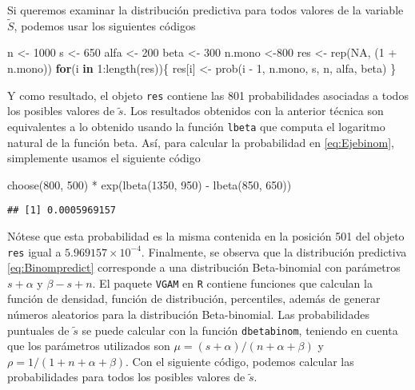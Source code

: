 \documentclass[
  12pt,
  spanish,
]{book}
\newenvironment{Shaded}{\begin{snugshade}}{\end{snugshade}}
\newcommand{\ConstantTok}[1]{\textcolor[rgb]{0.00,0.00,0.00}{#1}}
\newcommand{\ControlFlowTok}[1]{\textcolor[rgb]{0.13,0.29,0.53}{\textbf{#1}}}
\newcommand{\DecValTok}[1]{\textcolor[rgb]{0.00,0.00,0.81}{#1}}
\newcommand{\FunctionTok}[1]{\textcolor[rgb]{0.00,0.00,0.00}{#1}}
\newcommand{\NormalTok}[1]{#1}
\newcommand{\OtherTok}[1]{\textcolor[rgb]{0.56,0.35,0.01}{#1}}
\newcommand{\SpecialCharTok}[1]{\textcolor[rgb]{0.00,0.00,0.00}{#1}}
\theoremstyle{definition}
\theoremstyle{definition}
\theoremstyle{definition}
\theoremstyle{definition}
\theoremstyle{remark}
\begin{document}
Si queremos examinar la distribución predictiva para todos valores de la
variable \(\tilde{S}\), podemos usar los siguientes códigos

\begin{Shaded}
\begin{Highlighting}[]
\NormalTok{n }\OtherTok{\textless{}{-}} \DecValTok{1000}
\NormalTok{s }\OtherTok{\textless{}{-}} \DecValTok{650} 
\NormalTok{alfa }\OtherTok{\textless{}{-}} \DecValTok{200}
\NormalTok{beta }\OtherTok{\textless{}{-}} \DecValTok{300} 
\NormalTok{n.mono }\OtherTok{\textless{}{-}}\DecValTok{800}
\NormalTok{res }\OtherTok{\textless{}{-}} \FunctionTok{rep}\NormalTok{(}\ConstantTok{NA}\NormalTok{, (}\DecValTok{1} \SpecialCharTok{+}\NormalTok{ n.mono)) }
\ControlFlowTok{for}\NormalTok{(i }\ControlFlowTok{in} \DecValTok{1}\SpecialCharTok{:}\FunctionTok{length}\NormalTok{(res))\{}
\NormalTok{  res[i] }\OtherTok{\textless{}{-}} \FunctionTok{prob}\NormalTok{(i }\SpecialCharTok{{-}} \DecValTok{1}\NormalTok{, n.mono, s, n, alfa, beta)}
\NormalTok{\}}
\end{Highlighting}
\end{Shaded}

Y como resultado, el objeto \texttt{res} contiene las 801 probabilidades asociadas a todos los posibles valores de \(\tilde{s}\). Los resultados obtenidos con la anterior técnica son equivalentes a lo
obtenido usando la función \texttt{lbeta} que computa el logaritmo natural
de la función beta. Así, para calcular la probabilidad en
\eqref{eq:Ejebinom}, simplemente usamos el siguiente código

\begin{Shaded}
\begin{Highlighting}[]
\FunctionTok{choose}\NormalTok{(}\DecValTok{800}\NormalTok{, }\DecValTok{500}\NormalTok{) }\SpecialCharTok{*} \FunctionTok{exp}\NormalTok{(}\FunctionTok{lbeta}\NormalTok{(}\DecValTok{1350}\NormalTok{, }\DecValTok{950}\NormalTok{) }\SpecialCharTok{{-}} \FunctionTok{lbeta}\NormalTok{(}\DecValTok{850}\NormalTok{, }\DecValTok{650}\NormalTok{)) }
\end{Highlighting}
\end{Shaded}

\begin{verbatim}
## [1] 0.0005969157
\end{verbatim}

Nótese que esta probabilidad es la misma contenida en la posición 501 del objeto \texttt{res} igual a \ensuremath{5.969157\times 10^{-4}}. Finalmente, se observa que la distribución predictiva \eqref{eq:Binompredict} corresponde a una distribución
Beta-binomial con parámetros \(s+\alpha\) y \(\beta-s+n\). El paquete
\texttt{VGAM} \citep{VGAM} en \texttt{R} contiene funciones que calculan la
función de densidad, función de distribución, percentiles, además de
generar números aleatorios para la distribución Beta-binomial. Las
probabilidades puntuales de \(\tilde{s}\) se puede calcular con la función
\texttt{dbetabinom}, teniendo en cuenta que los parámetros utilizados son
\(\mu=(s+\alpha)/(n+\alpha+\beta)\) y \(\rho=1/(1+n+\alpha+\beta)\). Con el
siguiente código, podemos calcular las probabilidades para todos los
posibles valores de \(\tilde{s}\).
\end{document}
